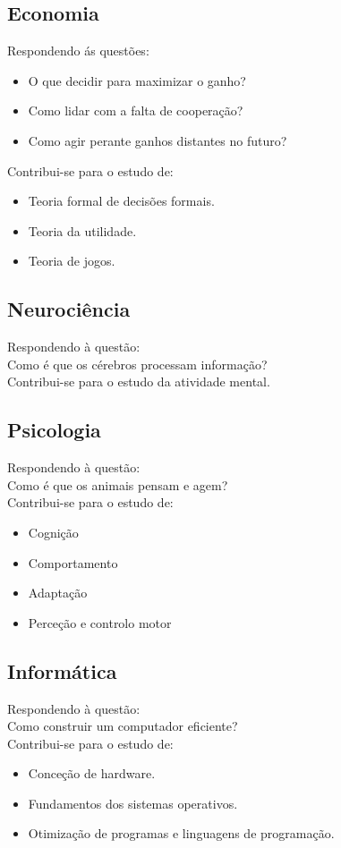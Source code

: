 \documentclass[]{report}
\begin{document}
\begin{multicols}{2}
\subsection{Economia}
Respondendo ás questões:
\begin{itemize}
	\item O que decidir para maximizar o ganho?
	\item Como lidar com a falta de cooperação?
	\item Como agir perante ganhos distantes no futuro?
\end{itemize}
Contribui-se para o estudo de:
\begin{itemize}
	\item Teoria formal de decisões formais.
	\item Teoria da utilidade.
	\item Teoria de jogos.
\end{itemize}
\subsection{Neurociência}
Respondendo à questão:\\
\indent Como é que os cérebros processam informação?\\
Contribui-se para o estudo da atividade mental.
\subsection{Psicologia}
Respondendo à questão:\\
\indent Como é que os animais pensam e agem?\\
Contribui-se para o estudo de:
\begin{itemize}
    \item Cognição
    \item Comportamento
    \item Adaptação
    \item Perceção e controlo motor
\end{itemize}
\subsection{Informática}
Respondendo à questão:\\
\indent Como construir um computador eficiente?\\
Contribui-se para o estudo de:
\begin{itemize}
\item Conceção de hardware.
\item Fundamentos dos sistemas operativos.
\item Otimização de programas e linguagens de programação.
\end{itemize}

\end{multicols}
\end{document}

